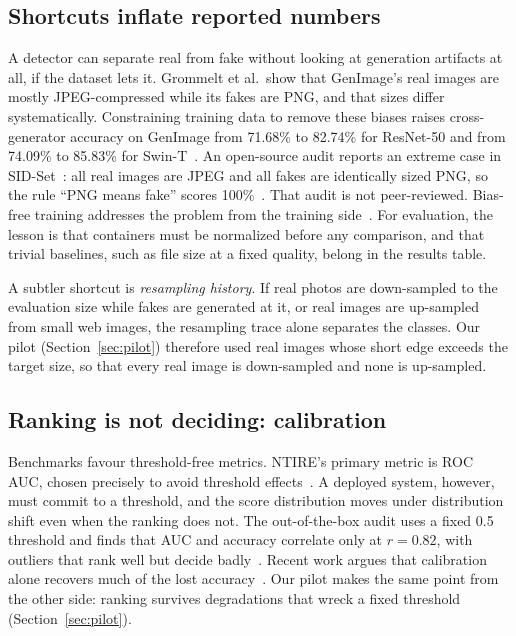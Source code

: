 \documentclass[conference]{IEEEtran}
\begin{document}
\subsection{Shortcuts inflate reported numbers}
A detector can separate real from fake without looking at generation
artifacts at all, if the dataset lets it. Grommelt et al.\ show that
GenImage's real images are mostly JPEG-compressed while its fakes are PNG,
and that sizes differ systematically. Constraining training data to remove
these biases raises cross-generator accuracy on GenImage from 71.68\% to
82.74\% for ResNet-50 and from 74.09\% to 85.83\% for Swin-T~\cite{grommelt2024fakeorjpeg}.
An open-source audit reports an extreme case in SID-Set~\cite{huang2025sida}:
all real images are JPEG and all fakes are identically sized PNG, so the
rule ``PNG means fake'' scores 100\%~\cite{kumar2026aigcdetect}. That audit
is not peer-reviewed. Bias-free training addresses the problem from the
training side~\cite{guillaro2025biasfree}. For evaluation, the lesson is
that containers must be normalized before any comparison, and that trivial
baselines, such as file size at a fixed quality, belong in the results table.

A subtler shortcut is \emph{resampling history}. If real photos are
down-sampled to the evaluation size while fakes are generated at it, or real
images are up-sampled from small web images, the resampling trace alone
separates the classes. Our pilot (Section~\ref{sec:pilot}) therefore used
real images whose short edge exceeds the target size, so that every real
image is down-sampled and none is up-sampled.

\subsection{Ranking is not deciding: calibration}
Benchmarks favour threshold-free metrics. NTIRE's primary metric is ROC AUC,
chosen precisely to avoid threshold effects~\cite{ntire2026robust}. A
deployed system, however, must commit to a threshold, and the score
distribution moves under distribution shift even when the ranking does not.
The out-of-the-box audit uses a fixed 0.5 threshold and finds that AUC and
accuracy correlate only at $r = 0.82$, with outliers that rank well but
decide badly~\cite{ren2026outofbox}. Recent work argues that calibration
alone recovers much of the lost accuracy~\cite{yang2026calibrated}. Our pilot
makes the same point from the other side: ranking survives degradations
that wreck a fixed threshold (Section~\ref{sec:pilot}).
\end{document}
